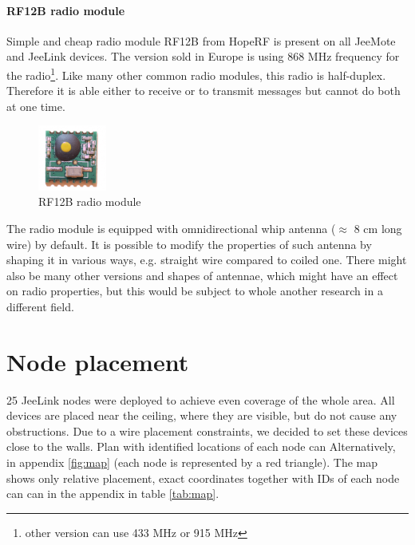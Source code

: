 \documentclass[
  print, %
  Table,   %
  nolof,     %
  nolot,     %
           oneside
]{fithesis3}
\begin{document}
\paragraph{RF12B radio module}\label{par:radio}
Simple and cheap radio module RF12B from HopeRF \cite{RF12B} is present on all JeeMote and JeeLink devices. The version sold in Europe is using 868 MHz frequency for the radio\footnote{other version can use 433 MHz or 915 MHz}. Like many other common radio modules, this radio is half-duplex. Therefore it is able either to receive or to transmit messages but cannot do both at one time.

\begin{figure}
  \vspace{-20pt}
  \begin{center}
    \includegraphics[width=0.2\textwidth]{../images/radio.png}
  \end{center}
  \caption{RF12B radio module}
  \label{fig:radio}
\end{figure}

The radio module is equipped with omnidirectional whip antenna ($\approx$ 8 cm long wire) by default. It is possible to modify the properties of such antenna by shaping it in various ways, e.g. straight wire compared to coiled one. There might also be many other versions and shapes of antennae, which might have an effect on radio properties, but this would be subject to whole another research in a different field.

\section{Node placement}\label{sec:place}
25 JeeLink nodes were deployed to achieve even coverage of the whole area. All devices are placed near the ceiling, where they are visible, but do not cause any obstructions. Due to a wire placement constraints, we decided to set these devices close to the walls. Plan with identified locations of each node can Alternatively, in appendix \ref{fig:map} (each node is represented by a red triangle). The map shows only relative placement, exact coordinates together with IDs of each node can can in the appendix in table \ref{tab:map}.
\end{document}
